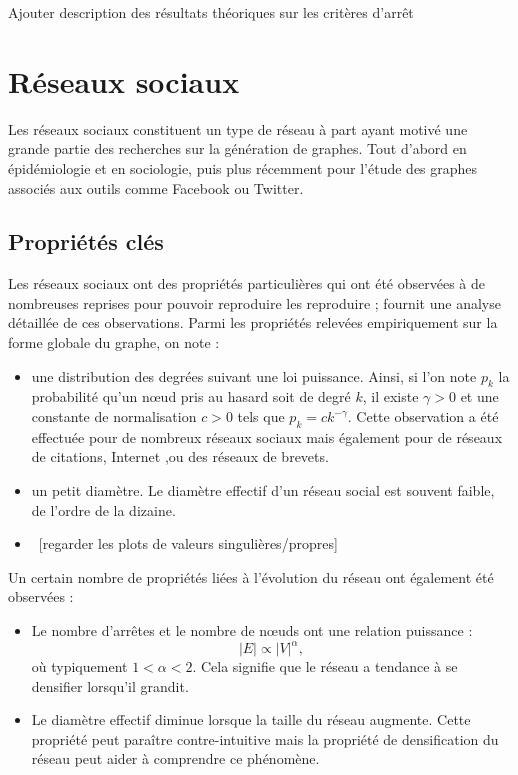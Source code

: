 \documentclass[a4paper]{article}
\begin{document}
\begin{todo}
Ajouter description des résultats théoriques sur les critères d'arrêt
\end{todo}

\section{Réseaux sociaux}
\label{sec:reseaux_sociaux}
    Les réseaux sociaux constituent un type de réseau à part ayant motivé une
    grande partie des recherches sur la génération de graphes. Tout d'abord en
    épidémiologie et en sociologie, puis plus récemment pour l'étude des
    graphes associés aux outils comme Facebook ou Twitter.

    \subsection{Propriétés clés}
    \label{sub:proprietes_cles}
        Les réseaux sociaux ont des propriétés particulières qui ont été
        observées à de nombreuses reprises pour pouvoir reproduire les
        reproduire ; \cite{Leskovec:2007:GED:1217299.1217301} fournit une
        analyse détaillée de ces observations. Parmi les propriétés relevées
        empiriquement sur la forme globale du graphe, on note :
        \begin{itemize}
            \item une distribution des degrées suivant une loi puissance.
                Ainsi, si l'on note $p_k$ la probabilité qu'un n\oe{}ud pris au
                hasard soit de degré $k$, il existe $\gamma > 0$ et une
                constante de normalisation $c > 0$ tels que
                $p_k = ck^{-\gamma}$. Cette observation a été effectuée pour de
                nombreux réseaux sociaux mais également pour de réseaux de
                citations, Internet \cite{chen2002origin},ou des réseaux de
                brevets.
            \item un petit diamètre. Le diamètre effectif d'un réseau social
                est souvent faible, de l'ordre de la dizaine.
            \item~[regarder les plots de valeurs singulières/propres]
        \end{itemize}
        Un certain nombre de propriétés liées à l'évolution du réseau ont
        également été observées :
        \begin{itemize}
            \item Le nombre d'arrêtes et le nombre de n\oe{}uds ont une
                relation puissance :
                \[
                    |E| \propto |V|^{\alpha},
                \]
                où typiquement $1 < \alpha < 2$. Cela signifie que le réseau a
                tendance à se densifier lorsqu'il grandit.
            \item Le diamètre effectif diminue lorsque la taille du réseau
                augmente. Cette propriété peut paraître contre-intuitive
                mais la propriété de densification du réseau peut aider à
                comprendre ce phénomène.
        \end{itemize}
\end{document}
